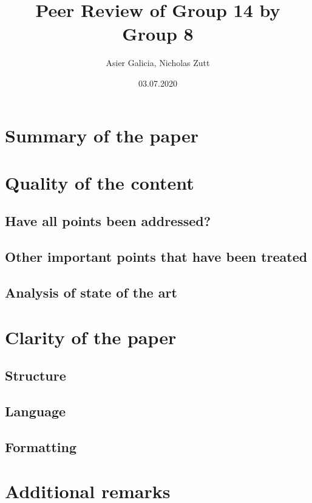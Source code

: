 \documentclass[11pt]{article}
\author{Asier Galicia, Nicholas Zutt}
\date{03.07.2020}
\title{Peer Review of Group 14 by Group 8}
\begin{document}
\maketitle

\section{Summary of the paper}
\label{sec:orgedc3537}

\section{Quality of the content}
\label{sec:org5a7153a}

\subsection{Have all points been addressed?}
\label{sec:orga9f4f3b}

\subsection{Other important points that have been treated}
\label{sec:org755729d}

\subsection{Analysis of state of the art}
\label{sec:org499eb16}

\section{Clarity of the paper}
\label{sec:orga36a625}

\subsection{Structure}
\label{sec:org31430d6}

\subsection{Language}
\label{sec:org3a2fb7e}

\subsection{Formatting}
\label{sec:org761cc12}

\section{Additional remarks}
\label{sec:org5cdd439}
\end{document}
